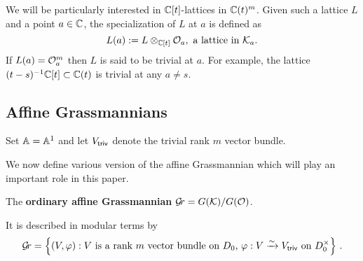 \documentclass[draft]{article}
\begin{document}
We will be particularly interested in $\CC[t]$-lattices in $ \CC(t)^m$.  Given such a lattice $ L $ and a point $ a \in \CC$, the specialization of $ L $ at $ a $ is defined as
$$
L(a) := L \otimes_{\CC[t]} \cO_a, \text{ a lattice in } \cK_a.  %
$$
If 
$L(a) = \cO_a^m$ then $L$ is said to be trivial at $a$. 
For example, the lattice $(t-s)^{-1}\CC[t] \subset \CC(t)$ is trivial at any $a\ne s$. 






\subsection{Affine Grassmannians} %
Set $\AA = \AA^1$ and let $\Vtriv$ denote the trivial rank $ m $ vector bundle. 

We now define various version of the affine Grassmannian which will play an important role in this paper.

\begin{definition}
     The \textbf{ordinary affine Grassmannian} $\Gr = G(\cK)/G(\cO)$.
\end{definition}    
    It is described in modular terms by 
    $$
     \Gr = 
    \left\{ (V, \varphi) : \text{$V$ is a rank $m$ vector bundle on $ D_0 $, $\varphi : V \xrightarrow{\sim} \Vtriv $ on $ D_0^\times $} \right\} \,. 
    $$
\end{document}
